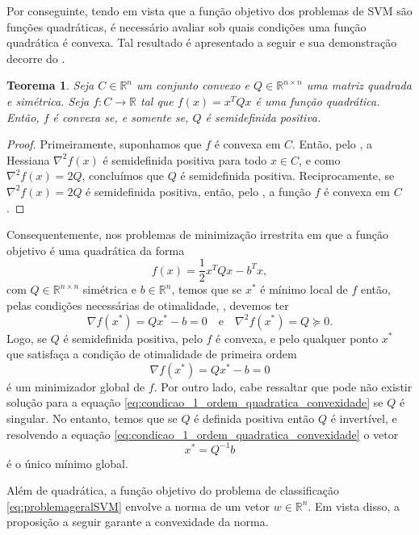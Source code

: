 \documentclass[12pt,a4paper]{scrartcl}
\def\RR{\mathds{R}}
\newtheorem{teo}{Teorema}
\theoremstyle{definition}%
\begin{document}
Por conseguinte, tendo em vista que a função objetivo dos problemas de SVM são funções quadráticas, é necessário avaliar sob quais condições uma função quadrática é convexa. Tal resultado é apresentado a seguir e sua demonstração decorre do .

\begin{teo} \label{teo:funcao_quadratica_e_convexa}
Seja $C \in \RR^{n}$ um conjunto convexo e $Q \in \RR^{n\times n}$ uma matriz quadrada e simétrica. Seja $f:C \rightarrow \RR$ tal que $f(x) = x^{T}Qx$ é uma função quadrática. Então, $f$ é convexa se, e somente se, $Q$ é semidefinida positiva.
\end{teo}
\begin{proof}
Primeiramente, suponhamos que $f$ é convexa em $C$. Então, pelo , a Hessiana $\nabla^{2} f(x)$ é semidefinida positiva para todo $x\in C$, e como $\nabla^{2} f(x) = 2Q$, concluímos que $Q$ é semidefinida positiva. Reciprocamente, se $\nabla^{2} f(x) = 2Q$ é semidefinida positiva, então, pelo , a função $f$ é convexa em $C$.
\end{proof}

Consequentemente, nos problemas de minimização irrestrita em que a função objetivo é uma quadrática da forma
\[
f(x) = \dfrac{1}{2}x^{T}Qx - b^{T}x,
\]
com $Q\in \RR^{n\times n}$ simétrica e $b\in \RR^{n}$, 
temos que se $x^{*}$ é mínimo local de $f$ então, pelas condições necessárias de otimalidade, , devemos ter
\[
\nabla f(x^{*})= Qx^{*}-b =0 \quad \text{e} \quad \nabla^{2} f(x^{*})=Q \succcurlyeq 0.
\]
Logo, se $Q$ é semidefinida positiva, pelo  $f$ é convexa, e pelo  qualquer ponto $x^{*}$ que satisfaça a condição de otimalidade de primeira ordem 
\[ \label{eq:condicao_1_ordem_quadratica_convexidade}
\nabla f(x^{*})= Qx^{*}-b =0
\] 
é um minimizador global de $f$. Por outro lado, cabe ressaltar que pode não existir solução para a equação \eqref{eq:condicao_1_ordem_quadratica_convexidade} se $Q$ é singular. No entanto, temos que se $Q$ é definida positiva então $Q$ é invertível, e resolvendo a equação \eqref{eq:condicao_1_ordem_quadratica_convexidade} o vetor
\[
x^{*} = Q^{-1}b
\]  
é o único mínimo global.

Além de quadrática, a função objetivo do problema de classificação \eqref{eq:problemageralSVM} envolve a norma de um vetor $w \in \RR^{n}$. Em vista disso, a proposição a seguir garante a convexidade da norma.
\end{document}
